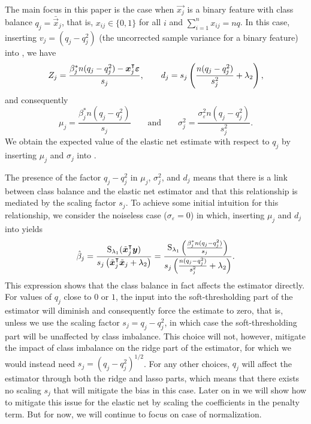 The main focus in this paper is the case when \(\vec{x_j}\) is a binary feature with class
balance \(q_j = \bar{\vec{x}}_j\), that is, \(x_{ij} \in \{0, 1\}\) for all \(i\) and
\(\sum_{i=1}^n x_{ij} = nq\). In this case, inserting \(v_j = (q_j - q_j^2)\) (the
uncorrected sample variance for a binary feature) into , we have
\[
  {Z_j} = \frac{\beta_j^* n(q_j - q_j^2) - \boldsymbol{x}_j^\intercal \boldsymbol{\varepsilon}}{s_j}
  ,\qquad
  d_j = s_j\left(\frac{n(q_j - q_j^2)}{s_j^2} + \lambda_2\right),
\]
and consequently
\[
  \mu_j = \frac{\beta^*_j n(q_j - q_j^2)}{s_j}\qquad \text{and} \qquad \sigma_j^2 = \frac{\sigma_\varepsilon^2n(q_j- q_j^2)}{s^2_j}.
\]
%
We obtain the expected value of the elastic net estimate with respect to \(q_j\) by
inserting \(\mu_j\) and \(\sigma_j\) into .

The presence of the factor \(q_j - q_j^2\) in \(\mu_j\), \(\sigma_j^2\), and \(d_j\) means
that there is a link between class balance and the elastic net estimator and that this
relationship is mediated by the scaling factor \(s_j\). To achieve some initial intuition
for this relationship, we consider the noiseless case (\(\sigma_\varepsilon = 0\)) in
which, inserting \(\mu_j\) and \(d_j\) into  yields
\begin{equation}
  \label{eq:noiseless-estimator}
  \hat{\beta}_j = \frac{\operatorname{S}_{\lambda_1}(\tilde{\boldsymbol{x}}_j^\intercal \boldsymbol{y})}{s_j\left(\tilde{\boldsymbol{x}}_j^\intercal \tilde{\boldsymbol{x}}_j + \lambda_2\right)}
  =
  \frac{\operatorname{S}_{\lambda_1}\left(\frac{\beta_j^* n (q_j - q_j^2)}{s_j}\right)}{s_j\left(\frac{n(q_j - q_j^2)}{s_j^2} + \lambda_2\right)}.
\end{equation}
%
This expression shows that the class balance in fact affects the estimator directly. For
values of \(q_j\) close to \(0\) or \(1\), the input into the soft-thresholding part of the
estimator will diminish and consequently force the estimate to zero, that is, unless we use
the scaling factor \(s_j = q_j - q_j^2\), in which case the soft-thresholding part will be
unaffected by class imbalance. This choice will not, however, mitigate the impact of class
imbalance on the ridge part of the estimator, for which we would instead need \(s_j = (q_j
- q_j^2)^{1/2}\). For any other choices, \(q_j\) will affect the estimator through both the
ridge and lasso parts, which means that there exists no scaling \(s_j\) that will mitigate
the bias in this case. Later on in  we will show how to mitigate
this issue for the elastic net by scaling the coefficients in the penalty term. But for
now, we will continue to focus on case of normalization.

